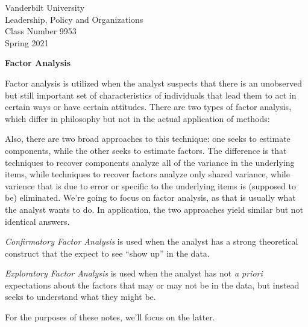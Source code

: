 \documentclass[12pt]{article}
\begin{document}
\thispagestyle{empty}%


\setlength{\parskip}{1ex plus 0.5ex minus 0.2ex}

\setcounter{secnumdepth}{-2}



\begin{flushleft}
Vanderbilt University\\Leadership, Policy and Organizations\\Class Number 9953\\ Spring 2021\\
\end{flushleft}

\begin{center}
\textbf{Factor Analysis}
\end{center}


Factor analysis is utilized when the analyst suspects  that there is
an unobserved but still important set of characteristics of
individuals that lead them to act in certain ways or have certain
attitudes. There are two types of factor analysis, which differ in
philosophy but not in the actual application of methods:

Also, there are two broad approaches to this technique: one seeks to
estimate components, while the other seeks to estimate factors. The
difference is that techniques to recover components analyze all of the
variance in the underlying items, while techniques to recover factors
analyze only shared variance, while varience that is due to error or
specific to the underlying items is (supposed to be) eliminated. We're
going to focus on factor analysis, as that is usually what the analyst
wants to do. In application, the two approaches yield similar but not
identical answers. 

\begin{description}

\item \emph{Confirmatory Factor Analysis} is used when the analyst
  has a strong theoretical construct that the expect to see ``show
  up'' in the data. 

\item \emph{Exploratory Factor Analysis} is used when the analyst has
  not \emph{a priori} expectations about the factors that may or may
  not be in the data, but instead seeks to understand what they might be.
\end{description}

For the purposes of these notes, we'll focus on the latter. 
\end{document}
